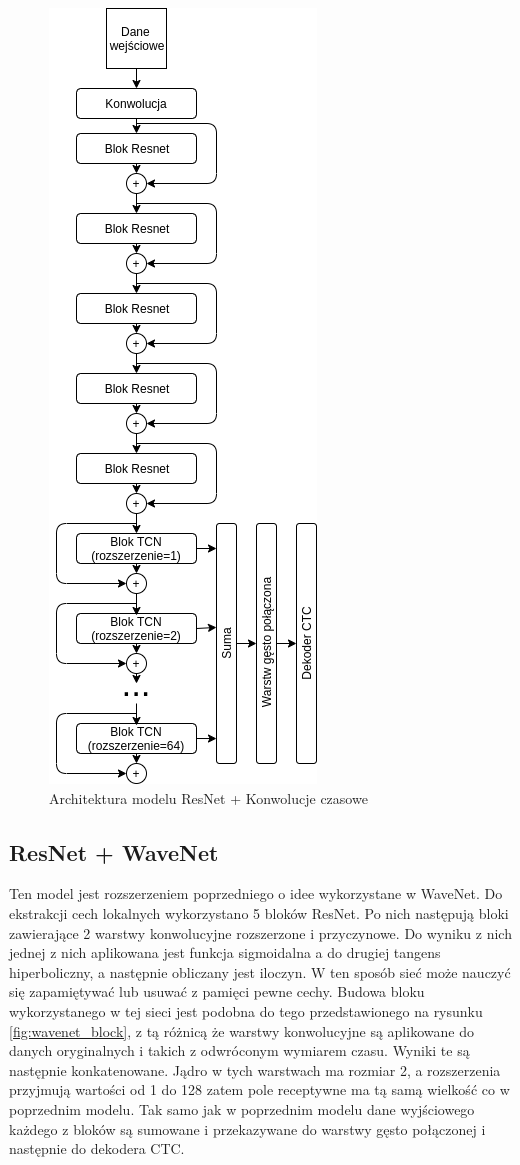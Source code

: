 \documentclass[a4paper,11pt,twoside]{report}
\theoremstyle{definition}
\begin{document}
\begin{figure}[h!]
	\centering
	\includegraphics[scale=0.7]{resnetTcn}
	\caption{Architektura modelu ResNet + Konwolucje czasowe}
\end{figure}

\subsection{ResNet + WaveNet}

Ten model jest rozszerzeniem poprzedniego o idee wykorzystane w WaveNet\cite{wavenet}. Do ekstrakcji cech lokalnych wykorzystano 5 bloków ResNet. Po nich następują bloki zawierające 2 warstwy konwolucyjne rozszerzone i przyczynowe. Do wyniku z nich jednej z nich aplikowana jest funkcja sigmoidalna a do drugiej tangens hiperboliczny, a następnie obliczany jest iloczyn. W ten sposób sieć może nauczyć się zapamiętywać lub usuwać z pamięci pewne cechy. Budowa bloku wykorzystanego w tej sieci jest podobna do tego przedstawionego na rysunku \ref{fig:wavenet_block}, z tą różnicą że warstwy konwolucyjne są aplikowane do danych oryginalnych i takich z odwróconym wymiarem czasu. Wyniki te są następnie konkatenowane. Jądro w tych warstwach ma rozmiar 2, a rozszerzenia przyjmują wartości od 1 do 128 zatem pole receptywne ma tą samą wielkość co w poprzednim modelu. Tak samo jak w poprzednim modelu dane wyjściowego każdego z bloków są sumowane i przekazywane do warstwy gęsto połączonej i następnie do dekodera CTC.
\end{document}
